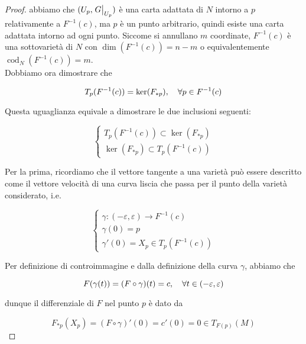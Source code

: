 \begin{proof}
	abbiamo che $ (U_{p},\eval{G}_{U_{p}}) $ è una carta adattata di $ N $ intorno a $ p $ relativamente a $ F^{-1}(c) $, ma $ p $ è un punto arbitrario, quindi esiste una carta adattata intorno ad ogni punto. Siccome si annullano $ m $ coordinate, $ F^{-1}(c) $ è una sottovarietà di $ N $ con $ \dim(F^{-1}(c)) = n-m $ o equivalentemente $ \operatorname{cod}_{N}(F^{-1}(c)) = m $.\\
	Dobbiamo ora dimostrare che
	
	\begin{equation}
		T_{p}(F^{-1}(c)) = \ker(F_{*p}) \qcomma \forall p \in F^{-1}(c)
	\end{equation} 
	
	Questa uguaglianza equivale a dimostrare le due inclusioni seguenti:
	
	\begin{equation}
		\begin{cases}
			T_{p}(F^{-1}(c)) \subset \ker(F_{*p})\\
			\ker(F_{*p}) \subset T_{p}(F^{-1}(c))
		\end{cases}
	\end{equation}
	
	Per la prima, ricordiamo che il vettore tangente a una varietà può essere descritto come il vettore velocità di una curva liscia che passa per il punto della varietà considerato, i.e.
	
	\begin{equation}
		\begin{cases}
			\gamma : (-\varepsilon,\varepsilon) \to F^{-1}(c)\\
			\gamma(0) = p\\
			\gamma'(0) = X_{p} \in T_{p}(F^{-1}(c))
		\end{cases}
	\end{equation}

	Per definizione di controimmagine e dalla definizione della curva $ \gamma $, abbiamo che
	
	\begin{equation}
		F(\gamma(t)) = (F \circ \gamma)(t) = c \qcomma \forall t \in (-\varepsilon,\varepsilon)
	\end{equation}
	
	dunque il differenziale di $ F $ nel punto $ p $ è dato da
	
	\begin{equation}
		F_{*p}(X_{p}) = (F \circ \gamma)'(0) %
		= c'(0) %
		= 0 \in T_{F(p)}(M)
	\end{equation}


\end{proof}
